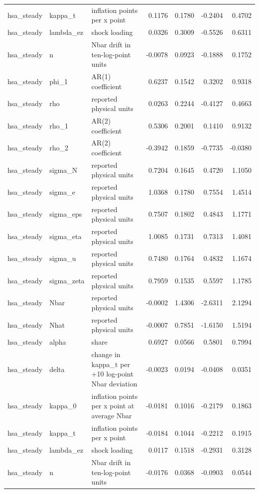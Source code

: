 \begin{tabular}{lllrrrr}
hsa\_steady & kappa\_t & inflation points per x point & 0.1176 & 0.1780 & -0.2404 & 0.4702 \\
hsa\_steady & lambda\_ez & shock loading & 0.0326 & 0.3009 & -0.5526 & 0.6311 \\
hsa\_steady & n & Nbar drift in ten-log-point units & -0.0078 & 0.0923 & -0.1888 & 0.1752 \\
hsa\_steady & phi\_1 & AR(1) coefficient & 0.6237 & 0.1542 & 0.3202 & 0.9318 \\
hsa\_steady & rho & reported physical units & 0.0263 & 0.2244 & -0.4127 & 0.4663 \\
hsa\_steady & rho\_1 & AR(2) coefficient & 0.5306 & 0.2001 & 0.1410 & 0.9132 \\
hsa\_steady & rho\_2 & AR(2) coefficient & -0.3942 & 0.1859 & -0.7735 & -0.0380 \\
hsa\_steady & sigma\_N & reported physical units & 0.7204 & 0.1645 & 0.4720 & 1.1050 \\
hsa\_steady & sigma\_e & reported physical units & 1.0368 & 0.1780 & 0.7554 & 1.4514 \\
hsa\_steady & sigma\_eps & reported physical units & 0.7507 & 0.1802 & 0.4843 & 1.1771 \\
hsa\_steady & sigma\_eta & reported physical units & 1.0085 & 0.1731 & 0.7313 & 1.4081 \\
hsa\_steady & sigma\_u & reported physical units & 0.7480 & 0.1764 & 0.4832 & 1.1674 \\
hsa\_steady & sigma\_zeta & reported physical units & 0.7959 & 0.1535 & 0.5597 & 1.1785 \\
hsa\_steady & Nbar & reported physical units & -0.0002 & 1.4306 & -2.6311 & 2.1294 \\
hsa\_steady & Nhat & reported physical units & -0.0007 & 0.7851 & -1.6150 & 1.5194 \\
hsa\_steady & alpha & share & 0.6927 & 0.0566 & 0.5801 & 0.7994 \\
hsa\_steady & delta & change in kappa\_t per +10 log-point Nbar deviation & -0.0023 & 0.0194 & -0.0408 & 0.0351 \\
hsa\_steady & kappa\_0 & inflation points per x point at average Nbar & -0.0181 & 0.1016 & -0.2179 & 0.1863 \\
hsa\_steady & kappa\_t & inflation points per x point & -0.0184 & 0.1044 & -0.2212 & 0.1915 \\
hsa\_steady & lambda\_ez & shock loading & 0.0117 & 0.1518 & -0.2931 & 0.3128 \\
hsa\_steady & n & Nbar drift in ten-log-point units & -0.0176 & 0.0368 & -0.0903 & 0.0544 \\

\end{tabular}
